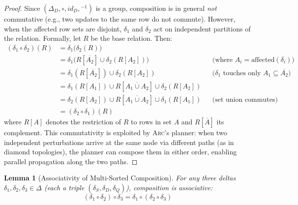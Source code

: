 \documentclass[sigplan,screen,nonacm]{acmart}
\newcommand{\arc}{\textsc{Arc}\xspace}
\newcommand{\DeltaD}{\Delta_{\!D}}
\newcommand{\compose}{\mathbin{\circ}}
\newtheorem{lemma}[theorem]{Lemma}
\begin{document}
\begin{proof}
Since $(\DeltaD, \compose, \mathit{id}_D, {}^{-1})$ is a group,
composition is in general \emph{not} commutative (e.g., two updates to
the same row do not commute).  However, when the affected row sets are
disjoint, $\delta_1$ and $\delta_2$ act on independent partitions of
the relation.  Formally, let $R$ be the base relation.  Then:
\begin{align*}
(\delta_1 \compose \delta_2)(R)
  &= \delta_1\bigl(\delta_2(R)\bigr) \\
  &= \delta_1\bigl(R[\overline{A_2}] \cup \delta_2(R[A_2])\bigr)
     && \text{(where $A_i = \mathrm{affected}(\delta_i)$)} \\
  &= \delta_1(R[\overline{A_2}]) \cup \delta_2(R[A_2])
     && \text{($\delta_1$ touches only $A_1 \subseteq \overline{A_2}$)} \\
  &= \delta_1(R[A_1]) \cup R[\overline{A_1 \cup A_2}] \cup \delta_2(R[A_2]) \\
  &= \delta_2(R[A_2]) \cup R[\overline{A_1 \cup A_2}] \cup \delta_1(R[A_1])
     && \text{(set union commutes)} \\
  &= (\delta_2 \compose \delta_1)(R)
\end{align*}
where $R[A]$ denotes the restriction of $R$ to rows in set $A$ and
$R[\overline{A}]$ its complement.
This commutativity is exploited by \arc's planner: when two independent
perturbations arrive at the same node via different paths (as in diamond
topologies), the planner can compose them in either order, enabling
parallel propagation along the two paths.
\end{proof}

\begin{lemma}[Associativity of Multi-Sorted Composition]\label{lem:assoc}
For any three deltas $\delta_1, \delta_2, \delta_3 \in \Delta$ (each a
triple $(\delta_S, \delta_D, \delta_Q)$), composition is associative:
\[
  (\delta_1 \compose \delta_2) \compose \delta_3
  = \delta_1 \compose (\delta_2 \compose \delta_3)
\]
\end{lemma}
\end{document}

